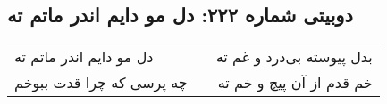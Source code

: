 \begin{center}
\section*{دوبیتی شماره ۲۲۲: دل مو دایم اندر ماتم ته}
\label{sec:222}
\begin{longtable}{l p{0.5cm} r}
دل مو دایم اندر ماتم ته
&&
بدل پیوسته بی‌درد و غم ته
\\
چه پرسی که چرا قدت ببوخم
&&
خم قدم از آن پیچ و خم ته
\\
\end{longtable}
\end{center}
